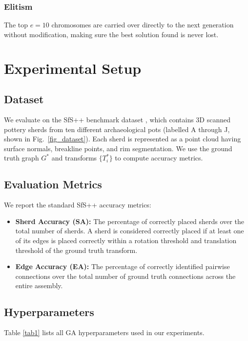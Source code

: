 \documentclass[conference]{IEEEtran}
\begin{document}
\subsubsection{Elitism}
The top $e = 10$ chromosomes are carried over directly to the next generation without modification, making sure the best solution found is never lost.

\section{Experimental Setup}
\subsection{Dataset}
We evaluate on the SfS++ benchmark dataset \cite{b2}, which contains 3D scanned pottery sherds from ten different archaeological pots (labelled A through J, shown in Fig.~\ref{fig_dataset}). Each sherd is represented as a point cloud having surface normals, breakline points, and rim segmentation. We use the ground truth graph $G^*$ and transforms $\{T_i^*\}$ to compute accuracy metrics.

\subsection{Evaluation Metrics}
We report the standard SfS++ accuracy metrics:
\begin{itemize}
\item \textbf{Sherd Accuracy (SA):} The percentage of correctly placed sherds over the total number of sherds. A sherd is considered correctly placed if at least one of its edges is placed correctly within a rotation threshold and translation threshold of the ground truth transform.
\item \textbf{Edge Accuracy (EA):} The percentage of correctly identified pairwise connections over the total number of ground truth connections across the entire assembly.
\end{itemize}

\subsection{Hyperparameters}
Table \ref{tab1} lists all GA hyperparameters used in our experiments.
\end{document}
